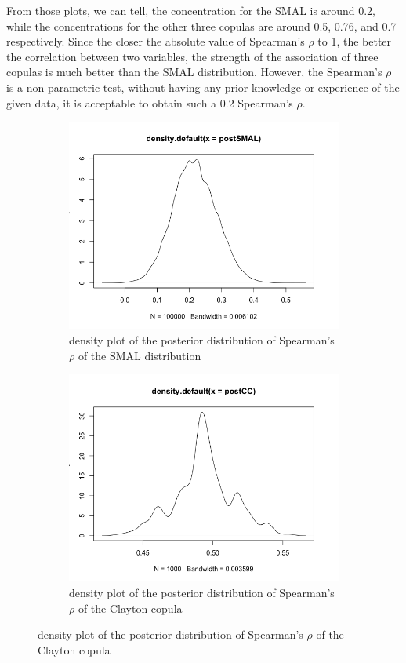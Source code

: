 \documentclass[mstat,12pt]{unswthesis}  %
\numberwithin{equation}{section}
\begin{document}
From those plots, we can tell, the concentration for the SMAL is around 0.2, while the concentrations for the other three copulas are around 0.5, 0.76, and 0.7 respectively. Since the closer the absolute value of Spearman's $\rho$ to 1, the better the correlation between two variables, the strength of the association of three copulas is much better than the SMAL distribution. However, the Spearman's $\rho$ is a non-parametric test, without having any prior knowledge or experience of the given data, it is acceptable to obtain such a 0.2 Spearman's $\rho$.
\newpage
\begin{figure}[h]
\begin{subfigure}{.5\textwidth}
  \centering
  \includegraphics[width=\linewidth]{postSMAL.png}  
  \caption{density plot of the posterior distribution of Spearman's $\rho$ of the SMAL distribution}
  \label{fig:sub-first}
\end{subfigure}
\begin{subfigure}{.5\textwidth}
  \centering
  \includegraphics[width=\linewidth]{postCC.png}  
  \caption{density plot of the posterior distribution of Spearman's $\rho$ of the Clayton copula}
  \label{fig:sub-second}
\end{subfigure}


\end{figure}
\end{document}
